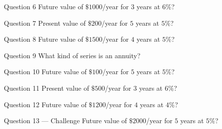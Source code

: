 \documentclass[11pt]{article}
\begin{document}
\begin{qbox}{Question 6}
Future value of $\$1000$/year for $3$ years at $6\%$?\workspace{2.4cm}
\end{qbox}

\begin{qbox}{Question 7}
Present value of $\$200$/year for $5$ years at $5\%$?\workspace{2.4cm}
\end{qbox}

\begin{qbox}{Question 8}
Future value of $\$1500$/year for $4$ years at $5\%$?\workspace{2.4cm}
\end{qbox}

\begin{qbox}{Question 9}
What kind of series is an annuity?\workspace{2.4cm}
\end{qbox}

\begin{qbox}{Question 10}
Future value of $\$100$/year for $5$ years at $5\%$?\workspace{2.4cm}
\end{qbox}

\begin{qbox}{Question 11}
Present value of $\$500$/year for $3$ years at $6\%$?\workspace{2.4cm}
\end{qbox}

\begin{qbox}{Question 12}
Future value of $\$1200$/year for $4$ years at $4\%$?\workspace{2.4cm}
\end{qbox}

\begin{qbox}{Question 13 --- Challenge}
Future value of $\$2000$/year for $5$ years at $5\%$?\workspace{3cm}
\end{qbox}

\clearpage
{}
\end{document}

